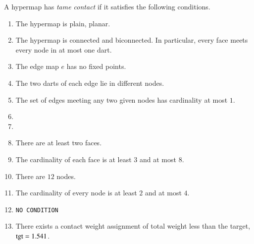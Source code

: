 A hypermap has {\it tame contact\/} if it satisfies the following
conditions.
%
%
%
%
%
%
%
%
%
\begin{enumerate}
    \item {} The hypermap is plain, planar.
    \item {} The hypermap is connected and biconnected.  In particular, every face meets every node in at most one dart.
    \item {} The edge map $e$ has no fixed points.
    \item {} The two darts of each edge lie in different nodes.
    \item {} The set of edges meeting any two given nodes has cardinality at most $1$.
      \item{}
    \item {}
  \item {} There are at least two faces.
    \item {} The cardinality of each face is at least $3$ and at most $8$.
    \item {} There are $12$ nodes.
    \item {} The cardinality of every node is at least $2$ and at most    $4$.
    \item {} {\tt NO CONDITION}
    \item {} There exists a contact weight assignment
        of total weight less than the target, ${\operatorname{tgt}}=1.541$.
\end{enumerate}
%

